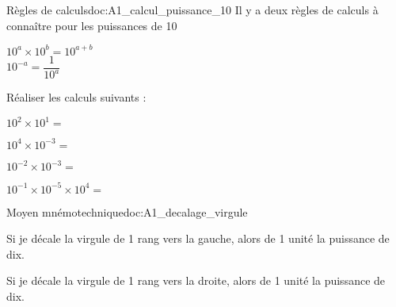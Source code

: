 \pasCorrection{\vspace*{-8pt}}
\begin{doc}{Règles de calculs}{doc:A1_calcul_puissance_10}
  Il y a deux règles de calculs à connaître pour les puissances de 10
  \begin{importants}
    \pointCyan $10^a \times 10^b = 10^{a + b}$ \\   
    \pointCyan $10^{-a} = \dfrac{1}{10^a}$
  \end{importants}
\end{doc}


\numeroQuestion Réaliser les calculs suivants :
\begin{multicols}{2}
  \begin{listePoints}
    \item $10^2 \times 10^1 =$ 
    \item $10^4 \times 10^{-3} =$ 
    \item $10^{-2} \times 10^{-3} =$ 
    \item $10^{-1} \times 10^{-5} \times 10^4 =$ 
  \end{listePoints}
\end{multicols}


\pasCorrection{\vspace*{-8pt}}
\begin{doc}{Moyen mnémotechnique}{doc:A1_decalage_virgule}
  \begin{listePoints}
    \item Si je décale la virgule de 1 rang vers la gauche, alors
     de 1 unité la puissance de dix. 
    \item Si je décale la virgule de 1 rang vers la droite, alors
     de 1 unité la puissance de dix. 
  \end{listePoints}
\end{doc}


\newpage
\vspace*{-36pt}

